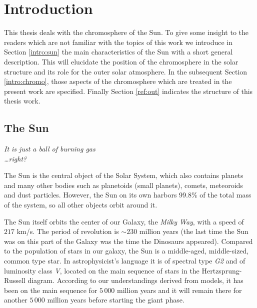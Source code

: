 \chapter{Introduction}

This thesis deals with the chromosphere of the Sun. To give some insight to the readers which are not familiar with the topics of this work we introduce in Section \ref{intro:sun} the main characteristics of the Sun with a short general description. This will elucidate the position of the chromosphere in the solar structure and its role for the outer solar atmosphere. In the subsequent Section \ref{intro:chromo}, those aspects of the chromosphere which are treated in the present work are specified. Finally Section \ref{ref:out} indicates the structure of this thesis work.
 

\section{The Sun\label{intro:sun}}
\begin{flushright}
\emph{It is just a ball of burning gas\\ \dots right?\\
\vspace{1cm}}
\end{flushright}

The Sun is the central object of the Solar System, which also contains planets and many other bodies such as planetoids (small planets), comets, meteoroids and dust particles. However, the Sun on its own harbors 99.8\% of the total mass of the system, so all other objects orbit around it. 

The Sun itself orbits the center of our Galaxy, the \emph{Milky Way}, with a speed of $217$ km/s. The period of revolution is $\sim230$ million years (the last time the Sun was on this part of the Galaxy was the time the Dinosaurs appeared). Compared to the population of stars in our galaxy, the Sun is a middle-aged, middle-sized, common type star. In astrophysicist's language it is of spectral type \emph{G2} and of luminosity class \emph{V}, located on the main sequence of stars in the Hertzsprung-Russell diagram. According to our understandings derived from models, it has been on the main sequence for $5\,000$ million years and it will remain there for another $5\,000$ million years before starting the giant phase.

